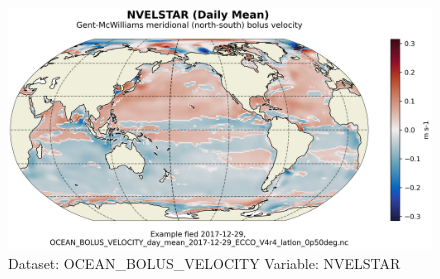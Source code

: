 \begin{figure}[H]
\centering
\includegraphics[scale=0.55]{../images/plots/latlon_plots/Gent-McWilliams_Ocean_Bolus_Velocity/NVELSTAR.png}
\caption{Dataset: OCEAN\_BOLUS\_VELOCITY Variable: NVELSTAR}
\label{tab:table-OCEAN_BOLUS_VELOCITY_NVELSTAR-Plot}
\end{figure}
\pagebreak
